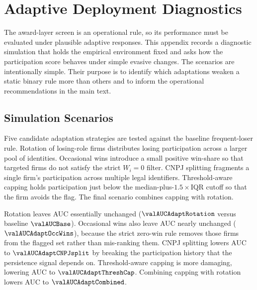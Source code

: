 \section{Adaptive Deployment Diagnostics}
\label{app:strategic_adaptation_submission}

The award-layer screen is an operational rule, so its performance
must be evaluated under plausible adaptive responses. This
appendix records a diagnostic simulation that holds the empirical
environment fixed and asks how the participation score behaves
under simple evasive changes. The scenarios are intentionally
simple. Their purpose is to identify which adaptations weaken a
static binary rule more than others and to inform the operational
recommendations in the main text.

\subsection{Simulation Scenarios}
\label{app:adaptation_scenarios_submission}

Five candidate adaptation strategies are tested against the
baseline frequent-loser rule. Rotation of losing-role firms
distributes losing participation across a larger pool of
identities. Occasional wins introduce a small positive
win-share so that targeted firms do not satisfy the strict
$W_i=0$ filter. CNPJ splitting fragments a single firm's
participation across multiple legal identifiers. Threshold-aware
capping holds participation just below the median-plus-$1.5\times$IQR
cutoff so that the firm avoids the flag. The final scenario
combines capping with rotation.

Rotation leaves AUC essentially unchanged
($\valAUCAdaptRotation$ versus baseline $\valAUCBase$).
Occasional wins also leave AUC nearly unchanged
($\valAUCAdaptOccWins$), because the strict zero-win rule
removes those firms from the flagged set rather than
mis-ranking them. CNPJ splitting lowers AUC to
$\valAUCAdaptCNPJsplit$ by breaking the participation history
that the persistence signal depends on. Threshold-aware capping
is more damaging, lowering AUC to $\valAUCAdaptThreshCap$.
Combining capping with rotation lowers AUC to
$\valAUCAdaptCombined$.

